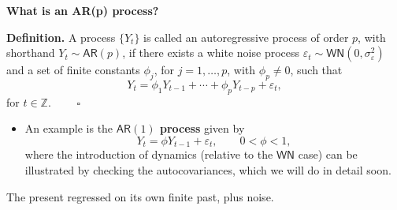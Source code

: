 \documentclass[
  letterpaper,
  DIV=11,
  numbers=noendperiod]{scrartcl}
\providecommand{\tightlist}{%
  \setlength{\itemsep}{0pt}\setlength{\parskip}{0pt}}
\newcommand{\slidelabel}[1]{{\color{embernavy}\bfseries\large #1\par\vspace{5pt}}}
\newenvironment{slidefooter}{%
  \par\vspace{7pt}{\color{emberrule}\rule{\linewidth}{0.4pt}}\par\vspace{4pt}%
  \color{emberamber}\itshape\small}{\par}
\begin{document}
\begin{slidebox}

\slidelabel{What is an AR(p) process?}

\textbf{Definition.} A process \(\{Y_t\}\) is called an autoregressive
process of order \(p\), with shorthand \(Y_t \sim \mathsf{AR}(p)\), if
there exists a white noise process
\(\varepsilon_t \sim \mathsf{WN}\left(0, \sigma_\varepsilon^2\right)\)
and a set of finite constants \(\phi_j\), for \(j = 1, \ldots, p\), with
\(\phi_p \neq 0\), such that
\[Y_t = \phi_1 Y_{t-1} + \cdots + \phi_p Y_{t-p} + \varepsilon_t,\] for
\(t \in \mathbb{Z}\). \(\qquad\square\)

\begin{itemize}
\tightlist
\item
  An example is the \textbf{\(\mathsf{AR}(1)\) process} given by
  \[Y_t = \phi Y_{t-1} + \varepsilon_t, \qquad 0 < \phi < 1,\] where the
  introduction of dynamics (relative to the \(\mathsf{WN}\) case) can be
  illustrated by checking the autocovariances, which we will do in
  detail soon.
\end{itemize}

\begin{slidefooter}

The present regressed on its own finite past, plus noise.

\end{slidefooter}

\end{slidebox}
\end{document}
